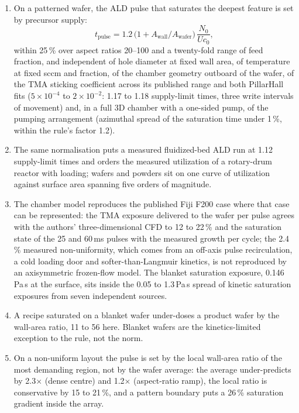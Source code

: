 \documentclass[11pt,letterpaper]{article}
\newcommand{\Awall}{A_{\mathrm{wall}}/A_{\mathrm{wafer}}}
\begin{document}
\begin{enumerate}
\item On a patterned wafer, the ALD pulse that saturates the deepest feature is set by precursor supply:
\begin{equation}
t_{\mathrm{pulse}} = 1.2\,\bigl(1 + \Awall\bigr)\,\frac{N_0}{U c_0},
\end{equation}
within 25\,\% over aspect ratios 20--100 and a twenty-fold range of feed fraction, and independent of hole diameter at fixed wall area, of temperature at fixed sccm and fraction, of the chamber geometry outboard of the wafer, of the TMA sticking coefficient across its published range and both PillarHall fits ($5\times10^{-4}$ to $2\times10^{-2}$: 1.17 to 1.18 supply-limit times, three write intervals of movement) and, in a full 3D chamber with a one-sided pump, of the pumping arrangement (azimuthal spread of the saturation time under 1\,\%, within the rule's factor 1.2).
\item The same normalisation puts a measured fluidized-bed ALD run at 1.12 supply-limit times and orders the measured utilization of a rotary-drum reactor with loading; wafers and powders sit on one curve of utilization against surface area spanning five orders of magnitude.
\item The chamber model reproduces the published Fiji F200 case where that case can be represented: the TMA exposure delivered to the wafer per pulse agrees with the authors' three-dimensional CFD to 12 to 22\,\% and the saturation state of the 25 and 60\,ms pulses with the measured growth per cycle; the 2.4\,\% measured non-uniformity, which comes from an off-axis pulse recirculation, a cold loading door and softer-than-Langmuir kinetics, is not reproduced by an axisymmetric frozen-flow model. The blanket saturation exposure, 0.146\,Pa\,s at the surface, sits inside the 0.05 to 1.3\,Pa\,s spread of kinetic saturation exposures from seven independent sources.
\item A recipe saturated on a blanket wafer under-doses a product wafer by the wall-area ratio, 11 to 56 here. Blanket wafers are the kinetics-limited exception to the rule, not the norm.
\item On a non-uniform layout the pulse is set by the local wall-area ratio of the most demanding region, not by the wafer average: the average under-predicts by 2.3$\times$ (dense centre) and 1.2$\times$ (aspect-ratio ramp), the local ratio is conservative by 15 to 21\,\%, and a pattern boundary puts a 26\,\% saturation gradient inside the array.

\end{enumerate}
\end{document}
